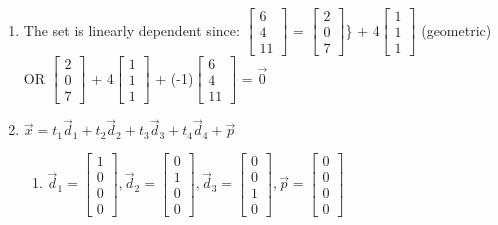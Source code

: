 \documentclass{article}
\begin{document}
\begin{solution}
\begin{enumerate}
\begin{enumerate}
            \end{enumerate}
        \item The set is linearly dependent since: $\begin{bmatrix}6\\4\\11\end{bmatrix}$ = $\begin{bmatrix}2\\0\\7\end{bmatrix}$\} + 4$\begin{bmatrix}1\\1\\1\end{bmatrix}$ (geometric) OR  $\begin{bmatrix}2\\0\\7\end{bmatrix}$ + 4$\begin{bmatrix}1\\1\\1\end{bmatrix}$ + (-1)$\begin{bmatrix}6\\4\\11\end{bmatrix}$ = $\Vec{0}$
        \item $\Vec{x} = t_{1}\Vec{d}_{1}+t_{2}\Vec{d}_{2}+t_{3}\Vec{d}_{3}+t_{4}\Vec{d}_{4}+\Vec{p}$
            \begin{enumerate}
                \item $\Vec{d}_{1} = \begin{bmatrix}1\\0\\0\\0\end{bmatrix}, \Vec{d}_{2} = \begin{bmatrix}0\\1\\0\\0\end{bmatrix}, \Vec{d}_{3} = \begin{bmatrix}0\\0\\1\\0\end{bmatrix}, \Vec{p} = \begin{bmatrix}0\\0\\0\\0\end{bmatrix}$

\end{enumerate}
\end{enumerate}
\end{solution}
\end{document}
